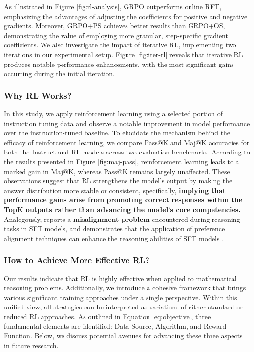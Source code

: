 \begin{itemize}[topsep=0pt]
\begin{itemize}[topsep=0pt]
As illustrated in Figure \ref{fig:rl-analysis}, GRPO outperforms online RFT, emphasizing the advantages of adjusting the coefficients for positive and negative gradients. Moreover, GRPO+PS achieves better results than GRPO+OS, demonstrating the value of employing more granular, step-specific gradient coefficients. We also investigate the impact of iterative RL, implementing two iterations in our experimental setup. Figure \ref{fig:iter-rl} reveals that iterative RL produces notable performance enhancements, with the most significant gains occurring during the initial iteration.

\subsubsection{Why RL Works?} In this study, we apply reinforcement learning using a selected portion of instruction tuning data and observe a notable improvement in model performance over the instruction-tuned baseline. To elucidate the mechanism behind the efficacy of reinforcement learning, we compare Pass@K and Maj@K accuracies for both the Instruct and RL models across two evaluation benchmarks. According to the results presented in Figure \ref{fig:maj-pass}, reinforcement learning leads to a marked gain in Maj@K, whereas Pass@K remains largely unaffected. These observations suggest that RL strengthens the model's output by making the answer distribution more stable or consistent, specifically, \textbf{implying that performance gains arise from promoting correct responses within the TopK outputs rather than advancing the model’s core competencies.} Analogously, \citep{wang2023making} reports a \textbf{misalignment problem} encountered during reasoning tasks in SFT models, and demonstrates that the application of preference alignment techniques can enhance the reasoning abilities of SFT models \citep{yuan2023rrhf,song2023preference,wang2023making}.

\subsubsection{How to Achieve More Effective RL?}
\label{sec:effec_rl}
Our results indicate that RL is highly effective when applied to mathematical reasoning problems. Additionally, we introduce a cohesive framework that brings various significant training approaches under a single perspective. Within this unified view, all strategies can be interpreted as variations of either standard or reduced RL approaches. As outlined in Equation \ref{eq:objective}, three fundamental elements are identified: Data Source, Algorithm, and Reward Function. Below, we discuss potential avenues for advancing these three aspects in future research.


\end{itemize}
\end{itemize}
